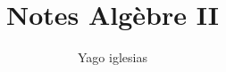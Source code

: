 \documentclass{article}
\theoremstyle{definition}
\theoremstyle{definition}
\theoremstyle{definition}
\theoremstyle{plain}
\theoremstyle{plain}
\theoremstyle{plain}
\theoremstyle{theorem}
\begin{document}
\title{Notes Algèbre II}
\author{Yago iglesias}
\maketitle
\tableofcontents




\end{document}
